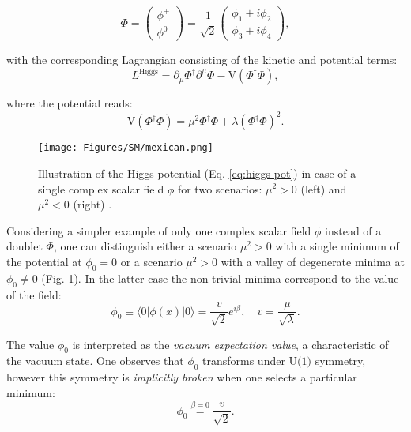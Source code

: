 \begin{equation}
    \Phi = \left(\begin{matrix} \phi^+ \\ \phi^0 \end{matrix}\right)  = \dfrac{1}{\sqrt{2}} \left(\begin{matrix} \phi_1 + i\phi_2 \\ \phi_3 + i\phi_4 \end{matrix}\right),
\end{equation}

with the corresponding Lagrangian consisting of the kinetic and potential terms:
\begin{equation}\label{eq:lagr-h}
    L^\text{Higgs} = \partial_\mu\Phi^\dag \partial^\mu\Phi - \text{V}(\Phi^\dag\Phi),
\end{equation}

where the potential reads:
\begin{equation}\label{eq:higgs-pot}
    \text{V}(\Phi^\dag\Phi) = \mu^2\Phi^\dag\Phi + \lambda (\Phi^\dag\Phi)^2.
\end{equation}

\begin{figure}[t!]
    \centering
    \texttt{[image: Figures/SM/mexican.png]}
    \caption{Illustration of the Higgs potential (Eq. \ref{eq:higgs-pot}) in case of a single complex scalar field $\phi$ for two scenarios: $\mu^2 > 0$ (left) and $\mu^2 < 0$ (right) \cite{Mulders:2019vhb}.}
    \label{fig:mexican}
\end{figure}

Considering a simpler example of only one complex scalar field $\phi$ instead of a \sutwo doublet $\Phi$, one can distinguish either a scenario $\mu^2 > 0$ with a single minimum of the potential at $\phi_0=0$ or a scenario $\mu^2 > 0$ with a valley of degenerate minima at $\phi_0 \neq 0$ (Fig. \ref{fig:mexican}). In the latter case the non-trivial minima correspond to the value of the field:
\begin{equation}\label{eq:vev-0}
    \phi_0 \equiv \langle 0 | \phi(x) | 0 \rangle = \dfrac{v}{\sqrt{2}}e^{i\beta}, \quad v = \dfrac{\mu}{\sqrt{\lambda}}.
\end{equation}

The value $\phi_0$ is interpreted as the \textit{vacuum expectation value}, a characteristic of the vacuum state. One observes that $\phi_0$ transforms under $\text{U(1)}$ symmetry, however this symmetry is \textit{implicitly broken} when one selects a particular minimum:
\begin{equation}
    \phi_0 \stackrel{\beta=0}{=} \dfrac{v}{\sqrt{2}}. 
\end{equation}

